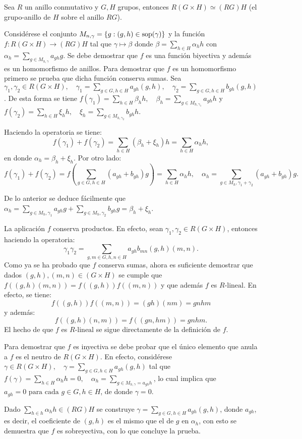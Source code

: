 \begin{lema}\label{lema1}
Sea $R$ un anillo conmutativo y $G, H$ grupos, entonces $R(G \times H) \simeq (RG)H$ (el grupo-anillo de $H$ sobre el anillo $RG$).
\end{lema}
\begin{proof*}
Considérese el conjunto $M_{n,\gamma} = \{ g: (g,h) \in \operatorname{sop}(\gamma)\}$ y la función $f \colon R(G \times H) \to (RG)H$ tal que $\gamma \mapsto \beta $ donde $\beta = \sum_{h \in H} \alpha_hh $  con $\alpha_h = \sum_{g \in M_{h,\gamma}}a_{gh}g$. Se debe demostrar que $f$ es una función biyectiva y además es un homomorfismo de anillos.
Para demostrar que $f$ es un homomorfismo primero se prueba que dicha función conserva sumas.
Sea $\gamma_1, \gamma_2 \in R(G \times H),\quad \gamma_1 = \sum_{g \in G, h \in H}a_{gh}(g,h), \quad  \gamma_2 = \sum_{g\in G, h\in H}b_{gh}(g,h)$. De esta forma se tiene $f(\gamma_1) = \sum_{h \in H}\beta_hh, \quad \beta_h = \sum_{g\in M_{h,\gamma_1}}a_{gh}h$ y $f(\gamma_2) = \sum_{h\in H}\xi_hh,\quad \xi_h = \sum_{g \in M_{h,\gamma_2}}b_{gh}h$.

Haciendo la operatoria se tiene:
\[ f(\gamma_1) + f(\gamma_2) = \sum_{h\in H}(\beta_h+\xi_h)h = \sum_{h\in H}\alpha_hh,\]
en donde $\alpha_h = \beta_h + \xi_h$.
Por otro lado:
\[ f(\gamma_1) + f(\gamma_2) = f\left(\sum_{g\in G, h\in H} (a_{gh} + b_{gh})g\right) = \sum_{h \in H}\alpha_hh, \quad \alpha_h = \sum_{g \in M_h, \gamma_1 + \gamma_2}(a_{gh} + b_{gh})g.\]

De lo anterior se deduce fácilmente que $\alpha_h = \sum_{g \in M_h, \gamma_1}a_{gh}g + \sum_{g \in M_h, \gamma_2}b_{gh}g = \beta_h + \xi_h$.

La aplicación $f$ conserva productos. En efecto, sean $\gamma_1,\gamma_2 \in R(G \times H)$, entonces haciendo la operatoria:
\[\gamma_1\gamma_2 = \sum_{g,m \in G, h,n \in H} a_{gh}b_{mn}(g,h)(m,n).\]
\indent Como ya se ha probado que $f$ conserva sumas, ahora es suficiente demostrar que dados $(g,h), (m,n) \in (G \times H)$ se cumple que $f((g,h)(m,n)) = f((g,h))f((m,n))$ y que además $f$ es $R\mbox{-lineal}$. En efecto, se tiene: 
\[ f((g,h))f((m,n)) = (gh)(nm) = gnhm  \]
y además:
\[  f((g,h)(n,m)) = f((gn,hm)) = gnhm.\]
\indent El hecho de que $f$ es $R\mbox{-lineal}$ se sigue directamente de la definición de $f$.

Para demostrar que $f$ es inyectiva se debe probar que el único elemento que anula a $f$ es el neutro de $R(G\times H)$. En efecto, considérese $\gamma \in R(G\times H), \quad \gamma = \sum_{g \in G, h\in H}a_{gh}(g,h) $ tal que $f(\gamma) = \sum_{h \in H}\alpha_hh = 0 , \quad \alpha_h = \sum_{g \in M_{h,\gamma} = a_{gh}h}$, lo cual implica que $a_{gh} = 0 \mbox{ para cada } g \in G, h\in H$, de donde $\gamma = 0$.

Dado $\sum_{h \in h}\alpha_hh \in (RG)H$ se construye $\gamma = \sum_{g \in G, h\in H}a_{gh}(g,h)$, donde $a_{gh}$, es decir, el coeficiente de $(g,h)$ es el mismo que el de $g$ en $\alpha_h$, con esto se demuestra que $f$ es sobreyectiva, con lo que concluye la prueba. 
\qedhere
\end{proof*}
